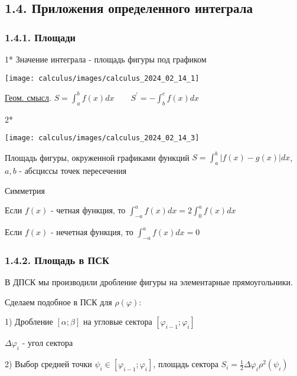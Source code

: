 \documentclass[12pt]{article}
\begin{document}
    \subsection{1.4. Приложения определенного интеграла}
    \hypertarget{integralapplications}{}

    \subsubsection{1.4.1. Площади}

    1* \Mem \hypertarget{integralareadpsk}{Значение интеграла} - площадь фигуры под графиком

    \begin{center}
        \texttt{[image: calculus/images/calculus\_2024\_02\_14\_1]}
    \end{center}

    \underline{Геом. смысл}. $S = \int_a^b f(x) dx \quad\quad S^\prime = -\int_b^c f(x)dx$

    \mediumvspace

    2*

    \begin{center}
        \texttt{[image: calculus/images/calculus\_2024\_02\_14\_3]}
    \end{center}

    Площадь фигуры, окруженной графиками функций $S = \int_a^b |f(x) - g(x)| dx$, $a, b$ - абсциссы точек пересечения

    \Nota Симметрия

    Если $f(x)$ - четная функция, то $\int_{-a}^a f(x) dx = 2 \int_0^a f(x)dx$

    Если $f(x)$ - нечетная функция, то $\int_{-a}^a f(x) dx = 0$

    \subsubsection{1.4.2. Площадь в ПСК}

    \hypertarget{integralareapsk}{В ДПСК мы производили дробление фигуры на элементарные прямоугольники.} Сделаем подобное в ПСК для $\rho(\varphi)$:

    1) Дробление $[\alpha;\beta]$ на угловые сектора $[\varphi_{i - 1};\varphi_i]$

    $\Delta \varphi_i$ - угол сектора

    2) Выбор средней точки $\psi_i \in [\varphi_{i - 1};\varphi_i]$, площадь сектора $S_i = \frac{1}{2} \Delta \varphi_i \rho^2(\psi_i)$
\end{document}
